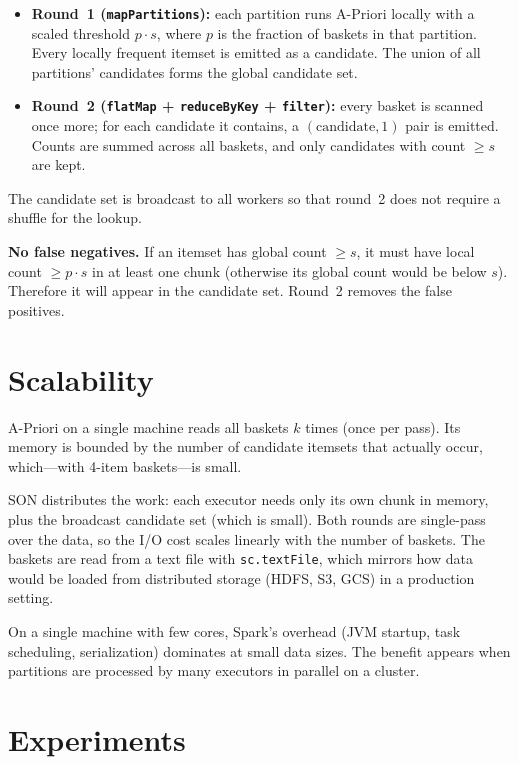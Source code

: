 \documentclass[11pt,a4paper]{article}
\begin{document}
\begin{itemize}
  \item \textbf{Round~1 (\texttt{mapPartitions}):} each partition runs A-Priori locally with a scaled
        threshold $p \cdot s$, where $p$ is the fraction of baskets in that partition. Every locally
        frequent itemset is emitted as a candidate. The union of all partitions' candidates forms the
        global candidate set.
  \item \textbf{Round~2 (\texttt{flatMap} + \texttt{reduceByKey} + \texttt{filter}):} every basket is
        scanned once more; for each candidate it contains, a $(\text{candidate}, 1)$ pair is emitted.
        Counts are summed across all baskets, and only candidates with count $\geq s$ are kept.
\end{itemize}

The candidate set is broadcast to all workers so that round~2 does not require a shuffle for the lookup.

\textbf{No false negatives.} If an itemset has global count $\geq s$, it must have local count $\geq p \cdot s$
in at least one chunk (otherwise its global count would be below $s$). Therefore it will appear in the
candidate set. Round~2 removes the false positives.

\section{Scalability}

A-Priori on a single machine reads all baskets $k$ times (once per pass). Its memory is bounded by the
number of candidate itemsets that actually occur, which---with 4-item baskets---is small.

SON distributes the work: each executor needs only its own chunk in memory, plus the broadcast candidate
set (which is small). Both rounds are single-pass over the data, so the I/O cost scales linearly with the
number of baskets. The baskets are read from a text file with \texttt{sc.textFile}, which mirrors how data
would be loaded from distributed storage (HDFS, S3, GCS) in a production setting.

On a single machine with few cores, Spark's overhead (JVM startup, task scheduling, serialization)
dominates at small data sizes. The benefit appears when partitions are processed by many executors in
parallel on a cluster.

\section{Experiments}
\end{document}
